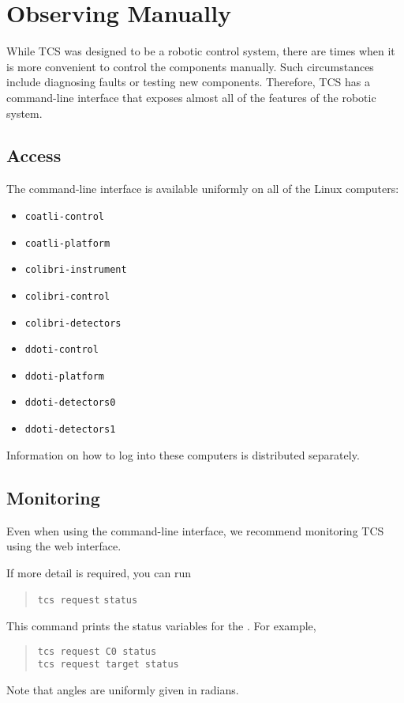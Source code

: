 \chapter{Observing Manually}
\label{chapter:observing-manually}

While TCS was designed to be a robotic control system, there are times when it is more convenient to control the components manually. Such circumstances include diagnosing faults or testing new components. Therefore, TCS has a command-line interface that exposes almost all of the features of the robotic system.

\section{Access}

The command-line interface is available uniformly on all of the Linux computers:
\begin{itemize}
\ifcoatli
\item \verb|coatli-control|
\item \verb|coatli-platform|
\item \verb|colibri-instrument|
\fi
\ifcolibri
\item \verb|colibri-control|
\item \verb|colibri-detectors|
\fi
\ifcoatli
\item \verb|ddoti-control|
\item \verb|ddoti-platform|
\item \verb|ddoti-detectors0|
\item \verb|ddoti-detectors1|
\fi
\end{itemize}
Information on how to log into these computers is distributed separately.

\section{Monitoring}

Even when using the command-line interface, we recommend monitoring TCS using the web interface. 

If more detail is required, you can run
\begin{quote}
\verb|tcs request|  \verb|status|
\end{quote}
This command prints the status variables for the . For example,
\begin{quote}
\verb|tcs request C0 status|\\
\verb|tcs request target status|
\end{quote}
Note that angles are uniformly given in radians.

